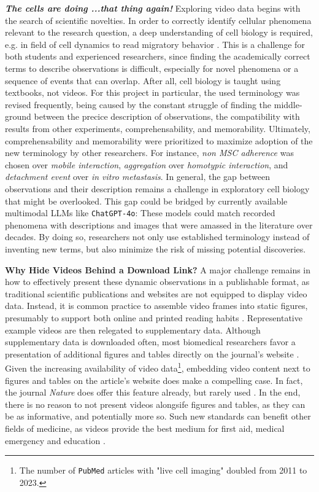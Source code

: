 \textbf{\textit{The cells are doing ...that thing again!}} Exploring video data
begins with the search of scientific novelties. In order to correctly identify
cellular phenomena relevant to the research question, a deep
understanding of cell biology is required, e.g. in field of cell dynamics to
read migratory behavior \cite{nalbantExploratoryCellDynamics2018}. This is a
challenge for both students and experienced researchers, since finding the
academically correct terms to describe observations is difficult, especially for
novel phenomena or a sequence of events that can overlap. After all, cell
biology is taught using textbooks, not videos. For this project in particular,
the used terminology was revised frequently, being caused by the constant
struggle of finding the middle-ground between the precice description of
observations, the compatibility with results from other experiments,
comprehensability, and memorability. Ultimately, comprehensability and
memorability were prioritized to maximize adoption of the new terminology by
other researchers. For instance, \emph{non MSC adherence} was chosen over
\emph{mobile interaction}, \emph{aggregation} over \emph{homotypic interaction},
and \emph{detachment event} over \emph{in vitro metastasis}. In general, the gap
between observations and their description remains a challenge in exploratory
cell biology that might be overlooked. This gap could be bridged by currently
available multimodal \acp{LLM} like \texttt{ChatGPT-4o}: These models could
match recorded phenomena with descriptions and images that were amassed in the
literature over decades. By doing so, researchers not only use established
terminology instead of inventing new terms, but also minimize the risk of
missing potential discoveries.

\textbf{Why Hide Videos Behind a Download Link?} A major challenge remains in how
to effectively present these dynamic observations in a publishable format, as
traditional scientific publications and websites are not equipped to display
video data. Instead, it is common practice to assemble video frames into static
figures, presumably to support both online and printed reading habits
\cite{perasDigitalPaperReading2023}. Representative example videos are then
relegated to supplementary data. Although supplementary data is downloaded
often, most biomedical researchers favor a presentation of additional figures
and tables directly on the journal's website
\cite{priceRoleSupplementaryMaterial2018}. Given the increasing availability of
video data\footnote{The number of \texttt{PubMed} articles with "live cell
    imaging" doubled from 2011 to 2023.}, embedding video content next to figures
and tables on the article's website does make a compelling case. In fact, the
journal \emph{Nature} does offer this feature already, but rarely used
\cite{NatureVideoContent}. In the end, there is no reason to not present videos
alongsife figures and tables, as they can be as informative, and potentially
more so. Such new standards can benefit other fields of medicine, as videos
provide the best medium for first aid, medical emergency and education
\cite{guptaDatasetMedicalInstructional2023}.

